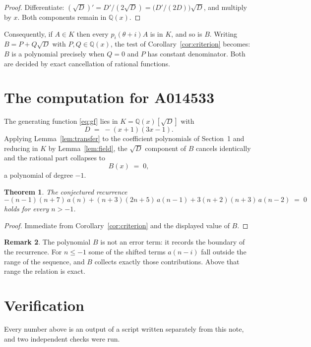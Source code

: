 \documentclass[11pt,a4paper]{article}
\theoremstyle{plain}
\newtheorem{theorem}{Theorem}
\theoremstyle{definition}
\newtheorem{remark}[theorem]{Remark}
\begin{document}
\begin{proof}
Differentiate: $(\sqrt{D})'=D'/(2\sqrt{D})=\bigl(D'/(2D)\bigr)\sqrt{D}$, and multiply by
$x$. Both components remain in $\mathbb{Q}(x)$.
\end{proof}

Consequently, if $A\in K$ then every $p_{i}(\theta+i)A$ is in $K$, and so is $B$. Writing
$B=P+Q\sqrt{D}$ with $P,Q\in\mathbb{Q}(x)$, the test of Corollary~\ref{cor:criterion}
becomes: $B$ is a polynomial precisely when $Q=0$ and $P$ has constant denominator. Both
are decided by exact cancellation of rational functions.

\section{The computation for A014533}

The generating function \eqref{eq:gf} lies in $K=\mathbb{Q}(x)[\sqrt{D}]$ with
\[
D \;=\; - \left(x + 1\right) \left(3 x - 1\right) .
\]
Applying Lemma~\ref{lem:transfer} to the coefficient polynomials of Section~1 and reducing
in $K$ by Lemma~\ref{lem:field}, the $\sqrt{D}$ component of $B$ cancels identically and
the rational part collapses to
\[
B(x)\;=\;0 ,
\]
a polynomial of degree $-1$.

\begin{theorem}
The conjectured recurrence
\[
- \left(n - 1\right) \left(n + 7\right)\,a(n) + \left(n + 3\right) \left(2 n + 5\right)\,a(n-1) + 3 \left(n + 2\right) \left(n + 3\right)\,a(n-2) \;=\;0
\]
holds for every $n>-1$.
\end{theorem}

\begin{proof}
Immediate from Corollary~\ref{cor:criterion} and the displayed value of $B$.
\end{proof}

\begin{remark}
The polynomial $B$ is not an error term: it records the boundary of the recurrence. For
$n\le-1$ some of the shifted terms $a(n-i)$ fall outside the range of the sequence,
and $B$ collects exactly those contributions. Above that range the relation is exact.
\end{remark}

\section{Verification}

Every number above is an output of a script written separately from this note, and two
independent checks were run.
\end{document}
